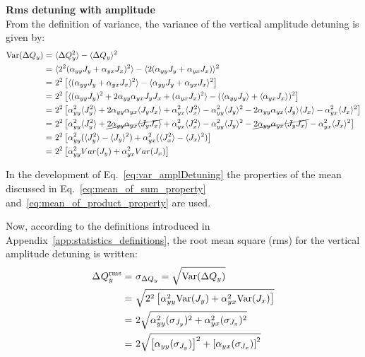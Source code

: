 \normalsize{\textbf{Rms detuning with amplitude}}\\
From the definition of variance, the variance of the vertical amplitude detuning is given by:
\begin{equation}\label{eq:var_amplDetuning}
    \begin{split}
        \mathrm{Var}(\Delta Q_y) = &~\langle \Delta Q_y ^2 \rangle - \langle \Delta Q_y \rangle ^2 \\
        = &~\langle 2^2 (\alpha_{yy} J_y + \alpha_{yx}J_x)^2 \rangle - \langle 2(\alpha_{yy}J_y + \alpha_{yx}J_x) \rangle^2 \\
        = &~2^2 \left [ \langle (\alpha_{yy} J_y + \alpha_{yx}J_x)^2 \rangle - \langle \alpha_{yy}J_y + \alpha_{yx}J_x \rangle^2 \right ] \\
         = &~2^2 \left [  \langle (\alpha_{yy} J_y)^2 + 2\alpha_{yy}\alpha_{yx}J_yJ_x + (\alpha_{yx} J_x)^2  \rangle - (\langle \alpha_{yy}J_y \rangle + \langle \alpha_{yx}J_x \rangle )^2 \right ]\\
         =&~2^2\left [ \alpha_{yy}^2 \langle J_y^2 \rangle + 2\alpha_{yy}\alpha_{yx} \langle J_yJ_x \rangle + \alpha_{yx}^2 \langle J_x^2 \rangle -\alpha_{yy}^2  \langle J_y \rangle^2 - 2\alpha_{yy} \alpha_{yx} \langle J_y \rangle \langle J_x \rangle - \alpha_{yx} ^2 \langle J_x \rangle^2 \right ]\\
         =&~2^2\left [ \alpha_{yy}^2 \langle J_y^2 \rangle + \cancel{2\alpha_{yy}\alpha_{yx} \langle J_yJ_x \rangle} + \alpha_{yx}^2 \langle J_x^2 \rangle -\alpha_{yy}^2  \langle J_y \rangle^2 - \cancel{2\alpha_{yy} \alpha_{yx} \langle J_y J_x \rangle} - \alpha_{yx} ^2 \langle J_x \rangle^2 \right ]\\
         =&~2^2\left [ \alpha_{yy}^2(\langle J_y^2\rangle - \langle J_y \rangle^2 ) + \alpha_{yx}^2(\langle J_x^2\rangle - \langle J_x \rangle^2 ) \right ]\\
         =&~2^2\left [ \alpha_{yy}^2 Var(J_y) + \alpha_{yx}^2 Var(J_x) \right ]
    \end{split}
\end{equation}

In the development of Eq.~\ref{eq:var_amplDetuning} the properties of the mean discussed in Eq.~\eqref{eq:mean_of_sum_property} and~\eqref{eq:mean_of_product_property} are used.


Now, according to the definitions introduced in Appendix~\ref{app:statistics_definitions}, the root mean square (rms) for the vertical amplitude detuning is written:
\begin{equation}\label{eq:rms_amplitude_detuning_1}
    \begin{split}
    {\Delta\: \!Q^\mathrm{rms}_{y}} =&~\sigma_{\Delta Q_y}=\sqrt{\mathrm{Var}(\Delta Q_y)}\\
    =&~\sqrt{2^2\left [ \alpha_{yy}^2 \mathrm{Var}(J_y) + \alpha_{yx}^2 \mathrm{Var}(J_x) \right ]}\\
    =&~2 \sqrt{\alpha_{yy}^2 (\sigma_{J_y})^2 + \alpha_{yx}^2 (\sigma_{J_x})^2 }\\
    =&~2 \sqrt{\left [\alpha_{yy} (\sigma_{J_y})\right ]^2 + \left [ \alpha_{yx} (\sigma_{J_x}) \right ]^2 }
    \end{split}
\end{equation}

